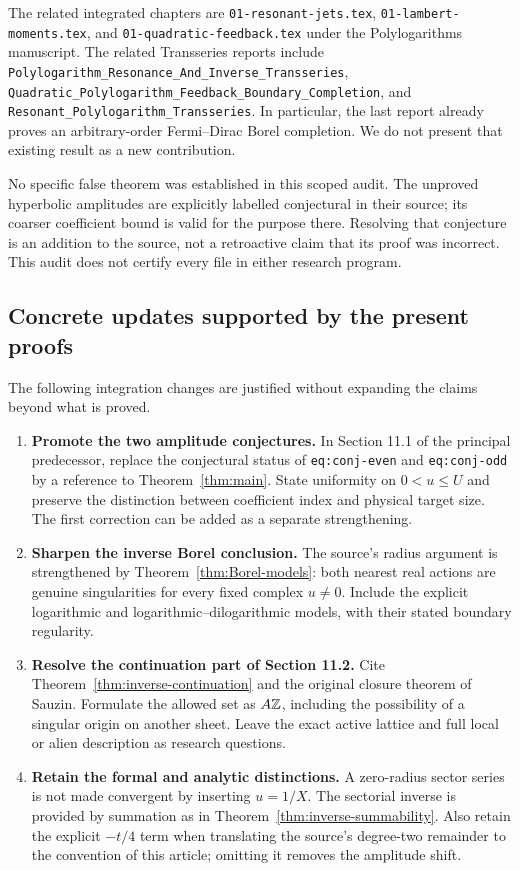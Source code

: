The related integrated chapters are
\nolinkurl{01-resonant-jets.tex}, \nolinkurl{01-lambert-moments.tex}, and
\nolinkurl{01-quadratic-feedback.tex} under the Polylogarithms manuscript.
The related Transseries reports include
\nolinkurl{Polylogarithm_Resonance_And_Inverse_Transseries},
\nolinkurl{Quadratic_Polylogarithm_Feedback_Boundary_Completion}, and
\nolinkurl{Resonant_Polylogarithm_Transseries}.
In particular, the last report already proves an arbitrary-order
Fermi--Dirac Borel completion. We do not present that existing result
as a new contribution.

No specific false theorem was established in this scoped audit.
The unproved hyperbolic amplitudes are explicitly labelled conjectural
in their source; its coarser coefficient bound is valid for the purpose
there. Resolving that conjecture is an addition to the source, not a
retroactive claim that its proof was incorrect. This audit does not
certify every file in either research program.

\subsection{Concrete updates supported by the present proofs}

The following integration changes are justified without expanding the
claims beyond what is proved.

\begin{enumerate}
 \item \textbf{Promote the two amplitude conjectures.}
 In Section 11.1 of the principal predecessor, replace the conjectural
 status of \texttt{eq:conj-even} and \texttt{eq:conj-odd} by a reference
 to Theorem~\ref{thm:main}. State uniformity on $0<u\le U$ and preserve
 the distinction between coefficient index and physical target size.
 The first correction can be added as a separate strengthening.

 \item \textbf{Sharpen the inverse Borel conclusion.}
 The source's radius argument is strengthened by
 Theorem~\ref{thm:Borel-models}: both nearest real actions are genuine
 singularities for every fixed complex $u\ne0$. Include the explicit
 logarithmic and logarithmic--dilogarithmic models, with their stated
 boundary regularity.

 \item \textbf{Resolve the continuation part of Section 11.2.}
 Cite Theorem~\ref{thm:inverse-continuation} and the original closure
 theorem of Sauzin. Formulate the allowed set as $A\mathbb Z$, including the
 possibility of a singular origin on another sheet. Leave the exact
 active lattice and full local or alien description as research questions.

 \item \textbf{Retain the formal and analytic distinctions.}
 A zero-radius sector series is not made convergent by inserting
 $u=1/X$. The sectorial inverse is provided by summation as in
 Theorem~\ref{thm:inverse-summability}. Also retain the explicit
 $-t/4$ term when translating the source's degree-two remainder to the
 convention of this article; omitting it removes the amplitude shift.
\end{enumerate}


